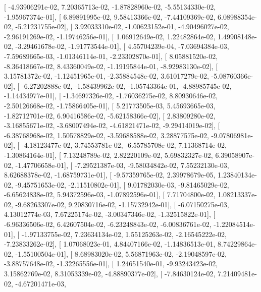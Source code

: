 \documentclass{article}
\begin{document}
       [ -4.93906291e-02,   7.20365713e-02,  -1.87828960e-02,
         -5.55134330e-02,  -1.95967374e-01],
       [  6.89891995e-02,   9.58413366e-02,  -7.44109369e-02,
          6.08988354e-02,  -5.21231755e-02],
       [  3.92033310e-02,  -1.00623152e-01,  -4.90496027e-02,
         -2.96191269e-02,  -1.19746256e-01],
       [  1.06912649e-02,   1.22482864e-02,   1.49908148e-02,
         -3.29461678e-02,  -1.91773544e-01],
       [  4.55704239e-04,  -7.03694384e-03,  -7.59689665e-03,
         -1.01346114e-01,  -2.23302870e-01],
       [  8.05881520e-02,  -8.36418667e-02,   8.43360049e-02,
         -1.19195844e-01,  -8.92983130e-02],
       [  3.15781372e-02,  -1.12451965e-01,  -2.35884548e-02,
          3.61017279e-02,  -5.08760366e-02],
       [ -6.27202888e-02,  -1.58439962e-02,  -1.05743364e-01,
         -4.88985745e-02,  -1.14434977e-01],
       [ -1.34697326e-02,  -1.76036275e-02,   8.80930646e-02,
         -2.50126668e-02,  -1.75866405e-01],
       [  5.21773505e-03,   5.45693665e-03,  -1.82712701e-02,
          6.90416586e-02,  -5.62158366e-02],
       [  2.83809280e-02,  -3.16855671e-02,  -3.68007494e-02,
         -4.61821471e-02,  -9.29414019e-02],
       [ -6.38768968e-02,   1.50578829e-02,  -3.59688588e-02,
          3.28877575e-02,  -9.07806981e-02],
       [ -4.18123477e-02,   3.74553781e-02,  -6.55785708e-02,
          7.11368714e-02,  -1.30864164e-01],
       [  7.13248789e-02,   2.82220109e-02,   5.69832327e-02,
          6.39058907e-02,  -1.47706658e-01],
       [ -7.29521387e-03,  -9.58034842e-02,   7.55232130e-03,
          8.62688378e-02,  -1.68759731e-01],
       [ -9.57359765e-02,   2.39978679e-05,   1.23840134e-02,
         -9.45751653e-02,  -2.11510802e-01],
       [  9.01782030e-03,  -9.81465029e-02,  -6.65624838e-02,
          5.94372596e-03,  -1.07892596e-01],
       [  7.71704800e-02,   1.08213337e-02,  -9.68263307e-02,
          9.20830716e-02,  -1.15732942e-01],
       [ -6.07150275e-03,   4.13012774e-03,   7.67225174e-02,
         -3.00347346e-02,  -1.32515822e-01],
       [ -6.96336506e-02,   6.42607504e-02,  -6.23248843e-02,
         -6.00836761e-02,  -1.22084514e-01],
       [ -1.97133755e-02,   7.23634134e-02,   1.55125263e-02,
         -2.16545222e-02,  -7.23833262e-02],
       [  1.07068023e-01,   4.84407166e-02,  -1.14836513e-01,
          8.74229864e-02,  -1.55100504e-01],
       [  8.68983020e-02,   5.56871963e-02,  -2.19048597e-02,
         -3.88757648e-02,  -1.32265556e-01],
       [  1.24651540e-01,  -9.93243423e-02,   3.15862769e-02,
          8.31053339e-02,  -4.88890377e-02],
       [ -7.84630124e-02,   7.21409481e-02,  -4.67201471e-03,
\end{document}

